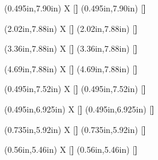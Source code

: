 \documentclass{article}
\begin{document}





        {\TextAt(0.495in,7.90in) {X}  [\footnotesize\bfseries]} %
        {\TextAt(0.495in,7.90in) { }  [\footnotesize\bfseries]} %

        {\TextAt(2.02in,7.88in) {X}  [\footnotesize\bfseries]} %
        {\TextAt(2.02in,7.88in) { }  [\footnotesize\bfseries]} %

        {\TextAt(3.36in,7.88in) {X}  [\footnotesize\bfseries]} %
        {\TextAt(3.36in,7.88in) { }  [\footnotesize\bfseries]} %

        {\TextAt(4.69in,7.88in) {X}  [\footnotesize\bfseries]} %
        {\TextAt(4.69in,7.88in) { }  [\footnotesize\bfseries]} %


    {\TextAt(0.495in,7.52in) {X}  [\footnotesize\bfseries]} %
    {\TextAt(0.495in,7.52in) { }  [\footnotesize\bfseries]} %





    {\TextAt(0.495in,6.925in) {X}  [\footnotesize\bfseries]} %
    {\TextAt(0.495in,6.925in) { }  [\footnotesize\bfseries]} %

    {\TextAt(0.735in,5.92in) {X} [\footnotesize\bfseries]} %
    {\TextAt(0.735in,5.92in) { } [\footnotesize\bfseries]} %






    {\TextAt(0.56in,5.46in) {X}  [\footnotesize\bfseries]} %
    {\TextAt(0.56in,5.46in) { }  [\footnotesize\bfseries]} %
\end{document}
